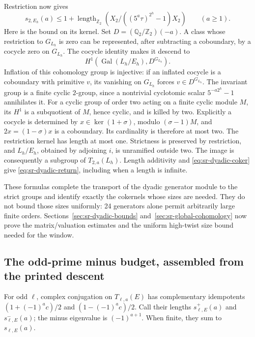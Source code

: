 Restriction now gives
\begin{equation}\label{eq:sr-dyadic-return}
 s_{2,E_h}(a)\leq1+
 \operatorname{length}_{\mathbb Z_2}
       \left(X_2/((5^a\tau)^{2^h}-1)X_2\right)
                  \qquad(a\geq1).
\end{equation}
Here is the bound on its kernel.
Set \(D=(\mathbb Q_2/\mathbb Z_2)(-a)\).
A class whose restriction to \(G_{L_h}\) is zero can be represented,
after subtracting a coboundary, by a cocycle zero on \(G_{L_h}\).
The cocycle identity makes it descend to
\[
 H^1(\operatorname{Gal}(L_h/E_h),D^{G_{L_h}}).
\]
Inflation of this cohomology group is injective: if an inflated cocycle
is a coboundary with primitive \(v\), its vanishing on \(G_{L_h}\)
forces \(v\in D^{G_{L_h}}\).
The invariant group is a finite cyclic \(2\)-group, since a
nontrivial cyclotomic scalar \(5^{-a2^h}-1\) annihilates it.
For a cyclic group of order two acting on a finite cyclic module
\(M\), its \(H^1\) is a subquotient of \(M\), hence cyclic, and is
killed by two. Explicitly a cocycle is determined by
\(x\in\ker(1+\sigma)\), modulo \((\sigma-1)M\), and
\(2x=(1-\sigma)x\) is a coboundary.
Its cardinality is therefore at most two.
The restriction kernel has length at most one.
Strictness is preserved by restriction, and \(L_h/E_h\), obtained
by adjoining \(i\), is unramified outside two.
The image is consequently a subgroup of \(T_{2,a}(L_h)\).
Length additivity and \eqref{eq:sr-dyadic-coker} give
\eqref{eq:sr-dyadic-return}, including when a length is infinite.

These formulas complete the transport of the dyadic generator
module to the strict groups and identify exactly the cokernels
whose sizes are needed. They do not bound those sizes uniformly:
24 generators alone permit arbitrarily large finite orders.
Sections~\ref{sec:sr-dyadic-bounds} and~\ref{sec:sr-global-cohomology}
now prove the matrix/valuation estimates and the uniform high-twist
size bound needed for the window.

\subsection{The odd-prime minus budget, assembled from the printed descent}
\label{sec:sr-minus-assembly}
For odd \(\ell\), complex conjugation on \(T_{\ell,a}(E)\) has complementary
idempotents \((1+(-1)^ac)/2\) and \((1-(-1)^ac)/2\).
Call their lengths \(s^+_{\ell,E}(a)\) and \(s^-_{\ell,E}(a)\);
the minus eigenvalue is \((-1)^{a+1}\).
When finite, they sum to \(s_{\ell,E}(a)\).

